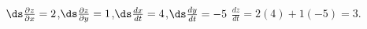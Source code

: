 {$\ds\frac{\partial z}{\partial x} = 2$,\quad $\ds\frac{\partial z}{\partial y} = 1$,\quad $\ds\frac{dx}{dt} = 4$,\quad $\ds\frac{dy}{dt} = -5$}
{$\frac{dz}{dt} = 2(4)+1(-5) = 3$.
}